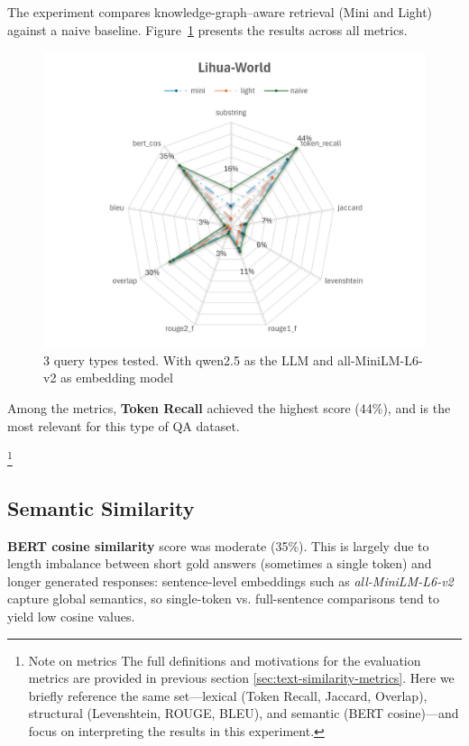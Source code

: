The experiment compares knowledge-graph–aware retrieval (Mini and Light) against a naive baseline.
Figure~\ref{fig:Lihua-World} presents the results across all metrics.
\begin{figure}[H]
    \centering
    \includegraphics[width=1\linewidth]{Figures/Lihua-World.jpg}
    \caption{3 query types tested. With qwen2.5 as the \gls{LLM} and all-MiniLM-L6-v2 as embedding model}
    \label{fig:Lihua-World}
\end{figure}
Among the metrics, \textbf{Token Recall} achieved the highest score (44\%), and is the most relevant for this type of QA dataset.

\footnote{Note on metrics The full definitions and motivations for the evaluation metrics are provided in previous section \ref{sec:text-similarity-metrics}. Here we briefly reference the same set—lexical (Token Recall, Jaccard, Overlap), structural (Levenshtein, ROUGE, BLEU), and semantic (\gls{BERT} cosine)—and focus on interpreting the results in this experiment.}

\subsection{Semantic Similarity}
	\textbf{\gls{BERT} cosine similarity} score was moderate (35\%). This is largely due to length imbalance between short gold answers (sometimes a single token) and longer generated responses: sentence-level embeddings such as \textit{all-MiniLM-L6-v2} capture global semantics, so single-token vs. full-sentence comparisons tend to yield low cosine values.

